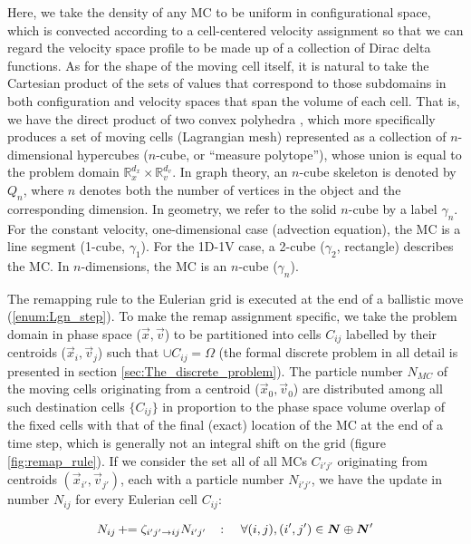 \documentclass[11pt,titlepage]{report}
\begin{document}
Here, we take the density of any MC to be uniform in configurational space, which is convected according to a cell-centered velocity assignment so that we can regard the velocity space profile to be made up of a collection of Dirac delta functions.\label{page:density_is_constant} As for the shape of the moving cell itself, it is natural to take the Cartesian product of the sets of values that correspond to those subdomains in both configuration and velocity spaces that span the volume of each cell. That is, we have the direct product of two convex polyhedra \cite{Guclu12}, which more specifically produces a set of moving cells (Lagrangian mesh) represented as a collection of $n$-dimensional hypercubes ($n$-cube, or ``measure polytope''), whose union is equal to the problem domain $\mathbb{R}_x^{d_x} \times \mathbb{R}_v^{d_v}$. In graph theory, an $n$-cube skeleton is denoted by $Q_n$, where $n$ denotes both the number of vertices in the object and the corresponding dimension. In geometry, we refer to the solid $n$-cube by a label $\gamma_n$.  For the constant velocity, one-dimensional case (advection equation), the MC is a line segment (1-cube, $\gamma_1$). For the 1D-1V case, a 2-cube ($\gamma_2$, rectangle) describes the MC. In $n$-dimensions, the MC is an $n$-cube ($\gamma_n$).

The remapping rule to the Eulerian grid is executed at the end of a ballistic move (\ref{enum:Lgn_step}). To make the remap assignment specific, we take the problem domain in phase space ($\vec{x}, \vec{v}$) to be partitioned into cells $C_{ij}$ labelled by their centroids ($\vec{x}_i, \vec{v}_j$) such that $\cup C_{ij} = \Omega$ (the formal discrete problem in all detail is presented in section \ref{sec:The_discrete_problem}). The particle number $N_{MC}$ of the moving cells originating from a centroid ($\vec{x}_{0},\vec{v}_{0}$) are distributed among all such destination cells $\{C_{ij}\}$ in proportion to the phase space volume overlap of the fixed cells with that of the final (exact) location of the MC at the end of a time step, which is generally not an integral shift on the grid (figure \ref{fig:remap_rule}). If we consider the set all of all MCs $C_{i'j'}$ originating from centroids $(\vec{x}_{i'},\vec{v}_{j'})$, each with a particle number $N_{i'j'}$, we have the update in number $N_{ij}$ for every Eulerian cell $C_{ij}$:

\begin{equation}\label{eq:N_MC_update}N_{ij}\, +\hspace{-.3em}= \zeta_{i'j'\to ij}N_{i'j'} \quad \colon \quad \forall (i,j),(i',j')\in \boldsymbol{N}\oplus\boldsymbol{N}'\end{equation}
\end{document}
